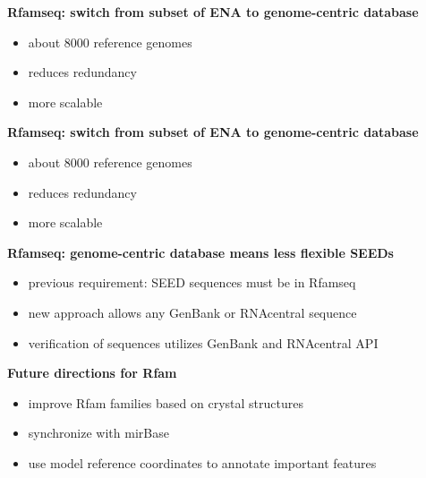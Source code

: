 \documentclass[landscape]{slides}
\begin{document}
\begin{slide}
\begin{center}
  \textbf{Rfamseq: switch from subset of ENA to genome-centric database}
  \begin{itemize}  
  \item about 8000 reference genomes
  \item reduces redundancy
  \item more scalable
  \end{itemize}
\end{center}    
\vfill
\end{slide}
\begin{slide}
\begin{center}
  \textbf{Rfamseq: switch from subset of ENA to genome-centric database}
  \begin{itemize}  
  \item about 8000 reference genomes
  \item reduces redundancy
  \item more scalable
  \end{itemize}

  \textbf{Rfamseq: genome-centric database means less flexible SEEDs}
  \begin{itemize}  
  \item previous requirement: SEED sequences must be in Rfamseq
  \item new approach allows any GenBank or RNAcentral sequence
  \item verification of sequences utilizes GenBank and RNAcentral API
  \end{itemize}
\end{center}    
\vfill
\end{slide}
\begin{slide}
\begin{center}
  \textbf{Future directions for Rfam}
  \begin{itemize}  
  \item improve Rfam families based on crystal structures
  \item synchronize with mirBase
  \item use model reference coordinates to annotate important features 
  \end{itemize}
\end{center}    
\vfill
\end{slide}
\end{document}
